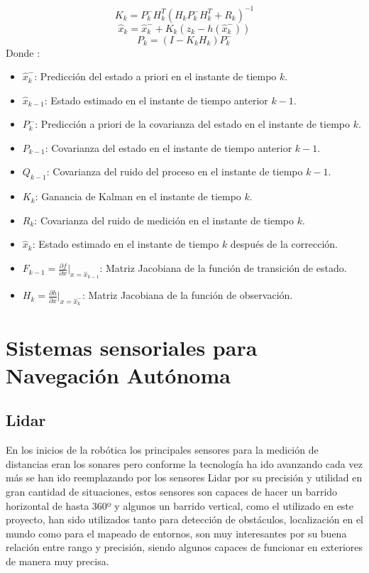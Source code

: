 \begin{equation}\label{eq:ganancia_kalman}
K_k = P_k^-H_k^T(H_kP_k^-H_k^T + R_k)^{-1}
\end{equation}
\begin{equation}\label{eq:actualizacion_estado}
\hat{x}_k = \hat{x}_k^- + K_k(z_k - h(\hat{x}_k^-))
\end{equation}
\begin{equation}\label{eq:actualizacion_covarianza}
P_k = (I - K_kH_k)P_k^-
\end{equation}
Donde :

\begin{itemize}
    \item \( \hat{x}_k^- \): Predicción del estado a priori en el instante de tiempo \( k \).
    \item \( \hat{x}_{k-1} \): Estado estimado en el instante de tiempo anterior \( k-1 \).
    \item \( P_k^- \): Predicción a priori de la covarianza del estado en el instante de tiempo \( k \).
    \item \( P_{k-1} \): Covarianza del estado en el instante de tiempo anterior \( k-1 \).
    \item \( Q_{k-1} \): Covarianza del ruido del proceso en el instante de tiempo \( k-1 \).
    \item \( K_k \): Ganancia de Kalman en el instante de tiempo \( k \).
    \item \( R_k \): Covarianza del ruido de medición en el instante de tiempo \( k \).
    \item \( \hat{x}_k \): Estado estimado en el instante de tiempo \( k \) después de la corrección.
    \item \( F_{k-1} = \frac{\partial f}{\partial x}\Bigg|_{x=\hat{x}_{k-1}} \): Matriz Jacobiana de la función de transición de estado.
    \item \( H_k = \frac{\partial h}{\partial x}\Bigg|_{x=\hat{x}_k^-} \): Matriz Jacobiana de la función de observación.
\end{itemize}



\section{Sistemas sensoriales para Navegación Autónoma}
\subsection{Lidar}
En los inicios de la robótica los principales sensores para la medición de distancias eran los sonares pero conforme la tecnología ha ido avanzando 
cada vez más se han ido reemplazando por los sensores Lidar por su precisión y utilidad en gran cantidad de situaciones, 
estos sensores son capaces de hacer un barrido horizontal de hasta 360º y algunos un barrido vertical, como el utilizado en este proyecto, 
han sido utilizados tanto para detección de obstáculos, localización en el mundo como para el mapeado de entornos, son muy interesantes 
por su buena relación entre rango y precisión, siendo algunos capaces de funcionar en exteriores de manera muy precisa.

